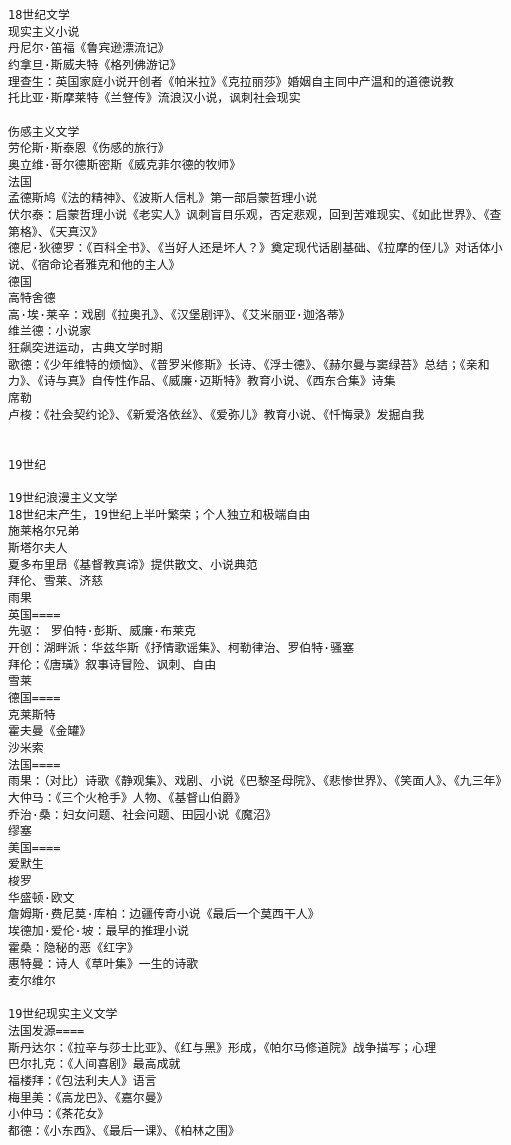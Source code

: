 \documentclass[UTF8]{../../RepresentationUniverse}
\begin{document}
\begin{lstlisting}
18世纪文学
现实主义小说
丹尼尔·笛福《鲁宾逊漂流记》
约拿旦·斯威夫特《格列佛游记》
理查生：英国家庭小说开创者《帕米拉》《克拉丽莎》婚姻自主同中产温和的道德说教
托比亚·斯摩莱特《兰豋传》流浪汉小说，讽刺社会现实

伤感主义文学
劳伦斯·斯泰恩《伤感的旅行》
奥立维·哥尔德斯密斯《威克菲尔德的牧师》
法国
孟德斯鸠《法的精神》、《波斯人信札》第一部启蒙哲理小说
伏尔泰：启蒙哲理小说《老实人》讽刺盲目乐观，否定悲观，回到苦难现实、《如此世界》、《查第格》、《天真汉》
德尼·狄德罗：《百科全书》、《当好人还是坏人？》奠定现代话剧基础、《拉摩的侄儿》对话体小说、《宿命论者雅克和他的主人》
德国
高特舍德
高·埃·莱辛：戏剧《拉奥孔》、《汉堡剧评》、《艾米丽亚·迦洛蒂》
维兰德：小说家
狂飙突进运动，古典文学时期
歌德：《少年维特的烦恼》、《普罗米修斯》长诗、《浮士德》、《赫尔曼与窦绿苔》总结；《亲和力》、《诗与真》自传性作品、《威廉·迈斯特》教育小说、《西东合集》诗集
席勒
卢梭：《社会契约论》、《新爱洛依丝》、《爱弥儿》教育小说、《忏悔录》发掘自我


19世纪

19世纪浪漫主义文学
18世纪末产生，19世纪上半叶繁荣；个人独立和极端自由
施莱格尔兄弟
斯塔尔夫人
夏多布里昂《基督教真谛》提供散文、小说典范
拜伦、雪莱、济慈
雨果
英国====
先驱： 罗伯特·彭斯、威廉·布莱克
开创：湖畔派：华兹华斯《抒情歌谣集》、柯勒律治、罗伯特·骚塞
拜伦：《唐璜》叙事诗冒险、讽刺、自由
雪莱
德国====
克莱斯特
霍夫曼《金罐》
沙米索
法国====
雨果：（对比）诗歌《静观集》、戏剧、小说《巴黎圣母院》、《悲惨世界》、《笑面人》、《九三年》
大仲马：《三个火枪手》人物、《基督山伯爵》
乔治·桑：妇女问题、社会问题、田园小说《魔沼》
缪塞
美国====
爱默生
梭罗
华盛顿·欧文
詹姆斯·费尼莫·库柏：边疆传奇小说《最后一个莫西干人》
埃德加·爱伦·坡：最早的推理小说
霍桑：隐秘的恶《红字》
惠特曼：诗人《草叶集》一生的诗歌
麦尔维尔

19世纪现实主义文学
法国发源====
斯丹达尔：《拉辛与莎士比亚》、《红与黑》形成，《帕尔马修道院》战争描写；心理
巴尔扎克：《人间喜剧》最高成就
福楼拜：《包法利夫人》语言
梅里美：《高龙巴》、《嘉尔曼》
小仲马：《茶花女》
都德：《小东西》、《最后一课》、《柏林之围》


\end{lstlisting}
\end{document}
